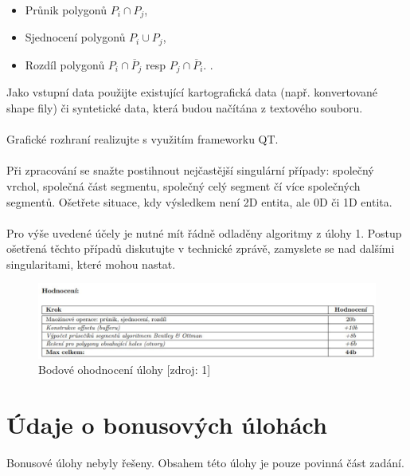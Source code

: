 \documentclass[a4paper, 12pt]{article}
\begin{document}
\begin{itemize}
\item Průnik polygonů $ P_i \cap P_j $,
\item Sjednocení polygonů $ P_i \cup P_j $,
\item Rozdíl polygonů $ P_i \cap \overline{P}_j $ resp $ P_j \cap \overline{P}_i $. .
\end{itemize}
Jako vstupní data použijte existující kartografická data (např. konvertované shape fily) či syntetické data, která budou načítána z textového souboru. \\
\\
Grafické rozhraní realizujte s využitím frameworku QT. \\
\\
Při zpracování se snažte postihnout nejčastější singulární případy: společný vrchol, společná část segmentu, společný celý segment čí více společných segmentů. Ošetřete situace, kdy výsledkem není 2D entita, ale 0D či 1D entita. \\
\\
Pro výše uvedené účely je nutné mít řádně odladěny algoritmy z úlohy 1. Postup ošetřená těchto případů diskutujte v technické zprávě, zamyslete se nad dalšími singularitami, které mohou nastat.

\begin{figure}[h!]
	\centering
	\includegraphics[width=12cm]{hodnoceni.jpg}
	\caption{Bodové ohodnocení úlohy [zdroj: 1]}
\end{figure}

\section{Údaje o bonusových úlohách}
Bonusové úlohy nebyly řešeny. Obsahem této úlohy je pouze povinná část zadání.

\newpage
\end{document}
